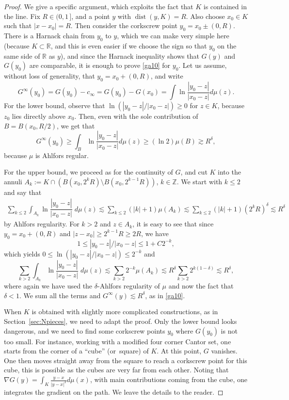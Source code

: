 \documentclass[JEP,XML,SOM,Unicode,published]{cedram}
\numberwithin{equation}{section}
\theoremstyle{plain}
\theoremstyle{definition}
\newcommand{\R}{\mathbb{R}}
\DeclareMathOperator{\dist}{dist}
\newcommand{\R}{\mathbb{R}}
\DeclareMathOperator{\dist}{dist}
\begin{document}
\begin{proof}
We give a specific argument, which exploits the fact that $K$ is contained in the line.
Fix $R\in (0,1\,]$, and a point $y$ with $\dist(y,K)=R$.
Also choose $x_0 \in K$ such that $|x-x_0| = R$. Then consider the corkscrew point
$y_0 = x_0 \pm (0,R)$. There is a Harnack chain from $y_0$ to $y$, which we can make very simple
here (because $K \subset \R$, and this is even easier if we choose the sign so that $y_0$ on the same side
of $\R$ as $y$), and since the Harnack inequality shows that $G(y)$ and $G(y_0)$ are comparable, it is enough
to prove \eqref{ga10} for $y_0$. Let us assume, without loss of generality, that $y_0 = x_0 + (0,R)$, and write
\[
G^\infty(y_0) = G(y_0)- c_\infty = G(y_0)-G(x_0)
= \int \ln \dfrac{|y_0-z|}{|x_0-z|}d \mu(z).
\]
For the lower bound, observe that $\ln(|y_0-z|/|x_0-z|) \ge 0$ for $z \in K$, because
$z_0$ lies directly above $x_0$. Then, even with the sole contribution of $B = B(x_0, R/2)$, we get that
\[
G^\infty(y_0) \geq \int_B \ln \dfrac{|y_0-z|}{|x_0-z|}d \mu(z)
\geq (\ln 2) \mu(B) \gtrsim R^\delta,
\]
because $\mu$ is Ahlfors regular.

For the upper bound, we proceed as for the continuity of $G$, and cut $K$ into the annuli
$ A_k := K \cap (B(x_0, 2^k R) \setminus B(x_0, 2^{k-1} R))$, $k \in \mathbb{Z}$.
We start with $k \leq 2$ and say that
\begin{align*}
\sum_{k \le 2} \int_{A_k} \ln \dfrac{|y_0-z|}{|x_0-z|} \; d\mu(z) \lesssim \sum_{k \le 2} (|k|+1) \mu(A_k)
\lesssim \sum_{k \le 2} (|k|+1) (2^k R)^\delta
\lesssim R^\delta
\end{align*}
by Ahlfors regularity.
For $k > 2$ and $z \in A_k$, it is easy to see that since $y_0 = x_0 + (0, R)$
and $|z-x_0| \geq 2^{k-1} R \geq 2R$, we have\vspace*{-3pt}
\[1 \leq |y_0-z|/|x_0-z| \leq 1 + C 2^{-k},
\]
which yields $0 \le \ln(|y_0-z|/|x_0-z|) \le 2^{-k}$ and\vspace*{-3pt}
\[
\sum_{k > 2} \int_{A_k} \ln \dfrac{|y_0-z|}{|x_0-z|} \; d\mu(z) \lesssim \sum_{k > 2} 2^{-k} \mu(A_k)
\lesssim R^\delta \sum_{k > 2} 2^{k(1-\delta)} \lesssim R^\delta,
\]
where again we have used the $\delta$-Ahlfors regularity of $\mu$ and now
the fact that $\delta <1$. We sum all the terms and $G^\infty(y) \lesssim R^\delta$, as in \eqref{ga10}.

When $K$ is obtained with slightly more complicated constructions, as in Section~\ref{sec:Npieces},
we need to adapt the proof.
Only the lower bound looks dangerous, and we need to find some corkscrew points $y_0$ where
$G(y_0)$ is not too small. For instance, working with a modified four corner Cantor set, one starts from the corner of a ``cube'' (or~square) of $K$. At this point, $G$ vanishes. One then moves straight away from the square to reach a corkscrew point for this cube, this is possible as the cubes are very far from each other. Noting that $\nabla G(y) = \int_K \frac{y-x}{|y-x|^2} d\mu(x)$, with main contributions coming from the cube, one integrates the gradient on the path. We leave the details to the reader.
\end{proof}
\end{document}

